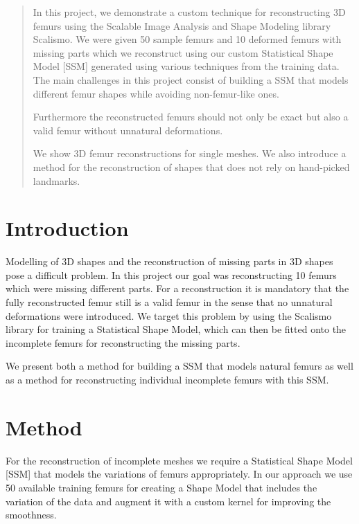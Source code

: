 \documentclass{article}
\begin{document}
	\begin{abstract}
		In this project, we demonstrate a custom technique for reconstructing 3D femurs using the Scalable Image Analysis and Shape Modeling library Scalismo. We were given 50 sample femurs and 10 deformed femurs with missing parts which we reconstruct using our custom Statistical Shape Model [SSM] generated using various techniques from the training data. The main challenges in this project consist of building a SSM that models different femur shapes while avoiding non-femur-like ones. 
		
		Furthermore the reconstructed femurs should not only be exact but also a valid femur without unnatural deformations. 
		
		We show 3D femur reconstructions for single meshes. We also introduce a method for the reconstruction of shapes that does not rely on hand-picked landmarks.
	\end{abstract}
	
	\section{Introduction}
	
	Modelling of 3D shapes and the reconstruction of missing parts in 3D shapes pose a difficult problem. In this project our goal was reconstructing 10 femurs which were missing different parts. For a reconstruction it is mandatory that the fully reconstructed femur still is a valid femur in the sense that no unnatural deformations were introduced. We target this problem by using the Scalismo library for training a Statistical Shape Model, which can then be fitted onto the incomplete femurs for reconstructing the missing parts.
	
	We present both a method for building a SSM that models natural femurs as well as a method for reconstructing individual incomplete femurs with this SSM.

	\section{Method}
	For the reconstruction of incomplete meshes we require a Statistical Shape Model [SSM] that models the variations of femurs appropriately. In our approach we use 50 available training femurs for creating a Shape Model that includes the variation of the data and augment it with a custom kernel for improving the smoothness.
	
\end{document}
